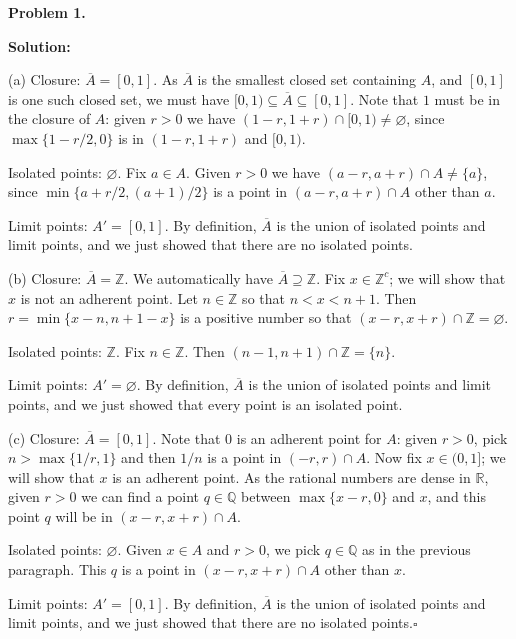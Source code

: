 \documentclass[12pt]{article}
\begin{document}
\newpage

\begin{tcolorbox}[
  enhanced, breakable,
  colback  = solgreen,
  colframe = green!45!black,
  fonttitle = \bfseries,
  title = {\textsc{Official Solution}\hfill Homework 9 -- Solutions}
]
\textbf{Problem 1.}

\medskip\textbf{Solution:}

\medskip
(a) Closure: $\overline{A} = [0, 1]$. As $\overline{A}$ is the smallest closed set containing $A$, and
$[0, 1]$ is one such closed set, we must have $[0, 1) \subseteq \overline{A} \subseteq [0, 1]$.
Note that $1$ must be in the closure of $A$: given $r > 0$ we have
$(1-r, 1+r) \cap [0, 1) \ne \varnothing$, since $\max\{1-r/2, 0\}$ is in $(1-r, 1+r)$ and
$[0, 1)$.

\medskip
Isolated points: $\varnothing$. Fix $a \in A$. Given $r > 0$ we have $(a-r, a+r) \cap A \ne \{a\}$, since
$\min\{a+r/2, (a+1)/2\}$ is a point in $(a-r, a+r) \cap A$ other than $a$.

\medskip
Limit points: $A' = [0, 1]$. By definition, $\overline{A}$ is the union of isolated points and limit points,
and we just showed that there are no isolated points.

\medskip
(b) Closure: $\overline{A} = \mathbb{Z}$. We automatically have $\overline{A} \supseteq \mathbb{Z}$. Fix
$x \in \mathbb{Z}^c$; we will show that $x$ is not an adherent point. Let $n \in \mathbb{Z}$ so that
$n < x < n+1$. Then $r = \min\{x-n, n+1-x\}$ is a positive number so that
$(x-r, x+r) \cap \mathbb{Z} = \varnothing$.

\medskip
Isolated points: $\mathbb{Z}$. Fix $n \in \mathbb{Z}$. Then $(n-1, n+1) \cap \mathbb{Z} = \{n\}$.

\medskip
Limit points: $A' = \varnothing$. By definition, $\overline{A}$ is the union of isolated points and limit points,
and we just showed that every point is an isolated point.

\medskip
(c) Closure: $\overline{A} = [0, 1]$. Note that $0$ is an adherent point for $A$: given $r > 0$, pick
$n > \max\{1/r, 1\}$ and then $1/n$ is a point in $(-r, r) \cap A$. Now fix $x \in (0, 1]$; we will
show that $x$ is an adherent point. As the rational numbers are dense in $\mathbb{R}$, given $r > 0$
we can find a point $q \in \mathbb{Q}$ between $\max\{x-r, 0\}$ and $x$, and this point $q$ will
be in $(x-r, x+r) \cap A$.

\medskip
Isolated points: $\varnothing$. Given $x \in A$ and $r > 0$, we pick $q \in \mathbb{Q}$ as in the previous
paragraph. This $q$ is a point in $(x-r, x+r) \cap A$ other than $x$.

\medskip
Limit points: $A' = [0, 1]$. By definition, $\overline{A}$ is the union of isolated points and limit points,
and we just showed that there are no isolated points.\hfill$\square$
\end{tcolorbox}
\end{document}
